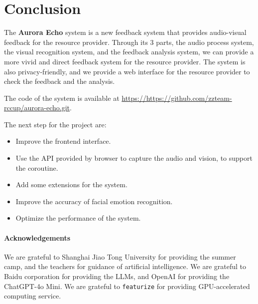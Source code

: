 \documentclass{article}
\begin{document}
    \section{Conclusion}\label{sec:conclusion}

    The \textbf{Aurora Echo} system is a new feedback system that provides audio-visual feedback for the resource provider.
    Through its 3 parts, the audio process system, the visual recognition system, and the feedback analysis system, we can provide a more vivid and direct feedback system for the resource provider.
    The system is also privacy-friendly, and we provide a web interface for the resource provider to check the feedback and the analysis.

    The code of the system is available at \url{https://https://github.com/zzteam-rccup/aurora-echo.git}.

    The next step for the project are:

    \begin{itemize}
        \item Improve the frontend interface.
        \item Use the API provided by browser to capture the audio and vision, to support the coroutine.
        \item Add some extensions for the system.
        \item Improve the accuracy of facial emotion recognition.
        \item Optimize the performance of the system.
    \end{itemize}

    \paragraph{Acknowledgements}

    We are grateful to Shanghai Jiao Tong University for providing the summer camp, and the teachers for guidance of artificial intelligence.
    We are grateful to Baidu corporation for providing the LLMs, and OpenAI for providing the ChatGPT-4o Mini.
    We are grateful to \texttt{featurize} for providing GPU-accelerated computing service.

    \nocite{*}
    
    
\end{document}
